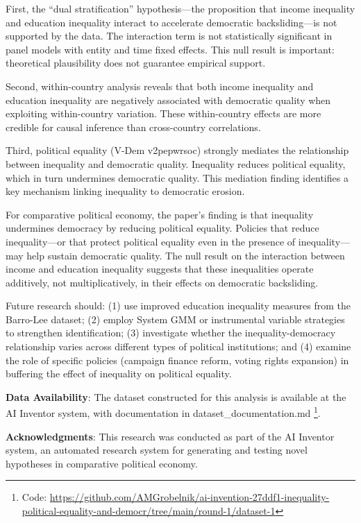 \documentclass[11pt,letterpaper]{article}
\begin{document}
First, the ``dual stratification'' hypothesis---the proposition that income inequality and education inequality interact to accelerate democratic backsliding---is not supported by the data. The interaction term is not statistically significant in panel models with entity and time fixed effects. This null result is important: theoretical plausibility does not guarantee empirical support.

Second, within-country analysis reveals that both income inequality and education inequality are negatively associated with democratic quality when exploiting within-country variation. These within-country effects are more credible for causal inference than cross-country correlations.

Third, political equality (V-Dem v2pepwrsoc) strongly mediates the relationship between inequality and democratic quality. Inequality reduces political equality, which in turn undermines democratic quality. This mediation finding identifies a key mechanism linking inequality to democratic erosion.

For comparative political economy, the paper's finding is that inequality undermines democracy by reducing political equality. Policies that reduce inequality---or that protect political equality even in the presence of inequality---may help sustain democratic quality. The null result on the interaction between income and education inequality suggests that these inequalities operate additively, not multiplicatively, in their effects on democratic backsliding.

Future research should: (1) use improved education inequality measures from the Barro-Lee dataset; (2) employ System GMM or instrumental variable strategies to strengthen identification; (3) investigate whether the inequality-democracy relationship varies across different types of political institutions; and (4) examine the role of specific policies (campaign finance reform, voting rights expansion) in buffering the effect of inequality on political equality.

\vspace{0.5cm}
\noindent \textbf{Data Availability}: The dataset constructed for this analysis is available at the AI Inventor system, with documentation in dataset\_documentation.md \footnote{Code: \url{https://github.com/AMGrobelnik/ai-invention-27ddf1-inequality-political-equality-and-democr/tree/main/round-1/dataset-1}}.

\vspace{0.3cm}
\noindent \textbf{Acknowledgments}: This research was conducted as part of the AI Inventor system, an automated research system for generating and testing novel hypotheses in comparative political economy.



\end{document}
